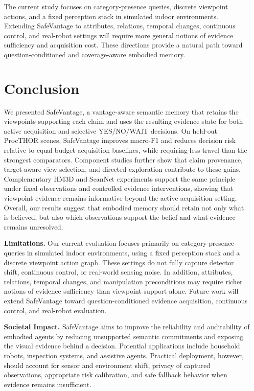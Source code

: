 \documentclass{article}
\begin{document}
The current study focuses on category-presence queries, discrete
viewpoint actions, and a fixed perception stack in simulated indoor
environments. Extending SafeVantage to attributes, relations, temporal
changes, continuous control, and real-robot settings will require more
general notions of evidence sufficiency and acquisition cost. These
directions provide a natural path toward question-conditioned and
coverage-aware embodied memory.


\section{Conclusion}

We presented SafeVantage, a vantage-aware semantic memory that retains
the viewpoints supporting each claim and uses the resulting evidence
state for both active acquisition and selective YES/NO/WAIT decisions.
On held-out ProcTHOR scenes, SafeVantage improves macro-F1 and reduces
decision risk relative to equal-budget acquisition baselines, while
requiring less travel than the strongest comparators. Component studies
further show that claim provenance, target-aware view selection, and
directed exploration contribute to these gains. Complementary HM3D and
ScanNet experiments support the same principle under fixed observations
and controlled evidence interventions, showing that viewpoint evidence
remains informative beyond the active acquisition setting. Overall, our
results suggest that embodied memory should retain not only what is
believed, but also which observations support the belief and what evidence
remains unresolved.

\textbf{Limitations.}
Our current evaluation focuses primarily on category-presence queries in
simulated indoor environments, using a fixed perception stack and a
discrete viewpoint action graph. These settings do not fully capture
detector shift, continuous control, or real-world sensing noise. In
addition, attributes, relations, temporal changes, and manipulation
preconditions may require richer notions of evidence sufficiency than
viewpoint support alone. Future work will extend SafeVantage toward
question-conditioned evidence acquisition, continuous control, and
real-robot evaluation.

\textbf{Societal Impact.}
SafeVantage aims to improve the reliability and auditability of embodied
agents by reducing unsupported semantic commitments and exposing the
visual evidence behind a decision. Potential applications include household
robots, inspection systems, and assistive agents. Practical deployment,
however, should account for sensor and environment shift, privacy of
captured observations, appropriate risk calibration, and safe fallback
behavior when evidence remains insufficient.
\end{document}
